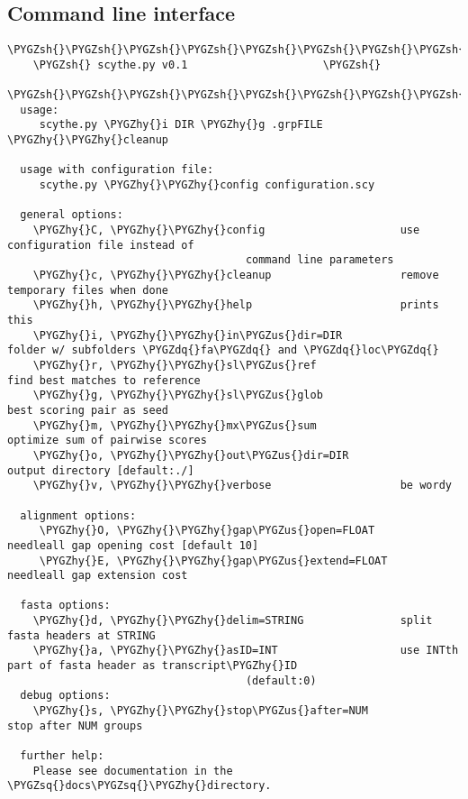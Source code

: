 \documentclass[letterpaper,10pt,english]{sphinxmanual}
\def\PYGZus{\char`\_}
\def\PYGZsh{\char`\#}
\def\PYGZhy{\char`\-}
\def\PYGZsq{\char`\'}
\def\PYGZdq{\char`\"}
\begin{document}
\subsection{Command line interface}
\label{Tutorial:command-line-interface}\label{Tutorial:cli}
\begin{Verbatim}[commandchars=\\\{\}]
    \PYGZsh{}\PYGZsh{}\PYGZsh{}\PYGZsh{}\PYGZsh{}\PYGZsh{}\PYGZsh{}\PYGZsh{}\PYGZsh{}\PYGZsh{}\PYGZsh{}\PYGZsh{}\PYGZsh{}\PYGZsh{}\PYGZsh{}\PYGZsh{}\PYGZsh{}\PYGZsh{}\PYGZsh{}\PYGZsh{}\PYGZsh{}\PYGZsh{}\PYGZsh{}\PYGZsh{}\PYGZsh{}\PYGZsh{}\PYGZsh{}\PYGZsh{}\PYGZsh{}\PYGZsh{}\PYGZsh{}\PYGZsh{}\PYGZsh{}\PYGZsh{}\PYGZsh{}\PYGZsh{}\PYGZsh{}\PYGZsh{}
    \PYGZsh{} scythe.py v0.1                     \PYGZsh{}
    \PYGZsh{}\PYGZsh{}\PYGZsh{}\PYGZsh{}\PYGZsh{}\PYGZsh{}\PYGZsh{}\PYGZsh{}\PYGZsh{}\PYGZsh{}\PYGZsh{}\PYGZsh{}\PYGZsh{}\PYGZsh{}\PYGZsh{}\PYGZsh{}\PYGZsh{}\PYGZsh{}\PYGZsh{}\PYGZsh{}\PYGZsh{}\PYGZsh{}\PYGZsh{}\PYGZsh{}\PYGZsh{}\PYGZsh{}\PYGZsh{}\PYGZsh{}\PYGZsh{}\PYGZsh{}\PYGZsh{}\PYGZsh{}\PYGZsh{}\PYGZsh{}\PYGZsh{}\PYGZsh{}\PYGZsh{}\PYGZsh{}
  usage:
     scythe.py \PYGZhy{}i DIR \PYGZhy{}g .grpFILE \PYGZhy{}\PYGZhy{}cleanup

  usage with configuration file:
     scythe.py \PYGZhy{}\PYGZhy{}config configuration.scy

  general options:
    \PYGZhy{}C, \PYGZhy{}\PYGZhy{}config                     use configuration file instead of
                                     command line parameters
    \PYGZhy{}c, \PYGZhy{}\PYGZhy{}cleanup                    remove temporary files when done
    \PYGZhy{}h, \PYGZhy{}\PYGZhy{}help                       prints this
    \PYGZhy{}i, \PYGZhy{}\PYGZhy{}in\PYGZus{}dir=DIR                 folder w/ subfolders \PYGZdq{}fa\PYGZdq{} and \PYGZdq{}loc\PYGZdq{}
    \PYGZhy{}r, \PYGZhy{}\PYGZhy{}sl\PYGZus{}ref                     find best matches to reference
    \PYGZhy{}g, \PYGZhy{}\PYGZhy{}sl\PYGZus{}glob                    best scoring pair as seed
    \PYGZhy{}m, \PYGZhy{}\PYGZhy{}mx\PYGZus{}sum                     optimize sum of pairwise scores
    \PYGZhy{}o, \PYGZhy{}\PYGZhy{}out\PYGZus{}dir=DIR                output directory [default:./]
    \PYGZhy{}v, \PYGZhy{}\PYGZhy{}verbose                    be wordy

  alignment options:
     \PYGZhy{}O, \PYGZhy{}\PYGZhy{}gap\PYGZus{}open=FLOAT           needleall gap opening cost [default 10]
     \PYGZhy{}E, \PYGZhy{}\PYGZhy{}gap\PYGZus{}extend=FLOAT         needleall gap extension cost

  fasta options:
    \PYGZhy{}d, \PYGZhy{}\PYGZhy{}delim=STRING               split fasta headers at STRING
    \PYGZhy{}a, \PYGZhy{}\PYGZhy{}asID=INT                   use INTth part of fasta header as transcript\PYGZhy{}ID
                                     (default:0)
  debug options:
    \PYGZhy{}s, \PYGZhy{}\PYGZhy{}stop\PYGZus{}after=NUM             stop after NUM groups

  further help:
    Please see documentation in the \PYGZsq{}docs\PYGZsq{}\PYGZhy{}directory.
\end{Verbatim}
\end{document}
